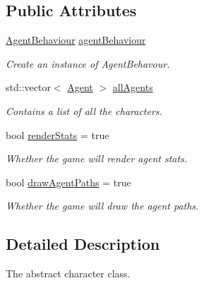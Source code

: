 \subsection*{Public Attributes}
\begin{DoxyCompactItemize}
\item 
\mbox{\label{class_agent_manager_ac83790e3aa445b1c1547d4c9a9016cb2}} 
\hyperlink{class_agent_behaviour}{Agent\+Behaviour} \hyperlink{class_agent_manager_ac83790e3aa445b1c1547d4c9a9016cb2}{agent\+Behaviour}
\begin{DoxyCompactList}\small\item\em Create an instance of Agent\+Behavour. \end{DoxyCompactList}\item 
\mbox{\label{class_agent_manager_a599aa8ac7b9ac078c77b493278d2b6da}} 
std\+::vector$<$ \hyperlink{class_agent}{Agent} $>$ \hyperlink{class_agent_manager_a599aa8ac7b9ac078c77b493278d2b6da}{all\+Agents}
\begin{DoxyCompactList}\small\item\em Contains a list of all the characters. \end{DoxyCompactList}\item 
\mbox{\label{class_agent_manager_a7d43712823386d03a70dede42b1358e2}} 
bool \hyperlink{class_agent_manager_a7d43712823386d03a70dede42b1358e2}{render\+Stats} = true
\begin{DoxyCompactList}\small\item\em Whether the game will render agent stats. \end{DoxyCompactList}\item 
\mbox{\label{class_agent_manager_a6b8f87746c5ff0deef91b13e5d1983c6}} 
bool \hyperlink{class_agent_manager_a6b8f87746c5ff0deef91b13e5d1983c6}{draw\+Agent\+Paths} = true
\begin{DoxyCompactList}\small\item\em Whether the game will draw the agent paths. \end{DoxyCompactList}\end{DoxyCompactItemize}


\subsection{Detailed Description}
The abstract character class. 

